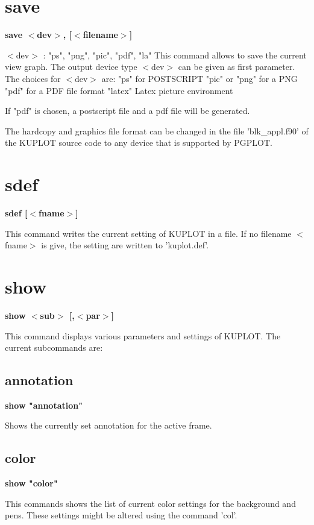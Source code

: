 \section{save}
{\bf save $ <$dev$> $, [$ <$filename$> $] \par }
\par
\vspace{3pt}
$ <$dev$> $ : "ps", "png", "pic", "pdf", "la" 
This command allows to save the current view graph. The output 
device type $ <$dev$> $ can be given as first parameter. The 
choices for $ <$dev$> $ are: 
"ps" for POSTSCRIPT 
"pic" or "png" for a PNG 
"pdf" for a PDF file format 
"latex" Latex picture environment 
\par
If "pdf" is chosen, a postscript file and a pdf file will be generated. 
\par
The hardcopy and graphics file format 
can be changed in the file 'blk\_appl.f90' of the KUPLOT source code 
to any device that is supported by PGPLOT. 
\section{sdef}
{\bf sdef [$ <$fname$> $] \par }
\par
\vspace{3pt}
This command writes the current setting of KUPLOT in a file. If 
no filename $ <$fname$> $ is give, the setting are written to 'kuplot.def'. 
\section{show}
{\bf show $ <$sub$> $ [,$ <$par$> $] \par }
\par
\vspace{3pt}
This command displays various parameters and settings of KUPLOT. 
The current subcommands are: 
\par
\subsection*{annotation}
{\bf show "annotation" \par }
\par
\vspace{3pt}
Shows the currently set annotation for the active frame. 
\subsection*{color}
{\bf show "color" \par }
\par
\vspace{3pt}
This commands shows the list of current color settings for the 
background and pens. These settings might be altered using the 
command 'col'. 
